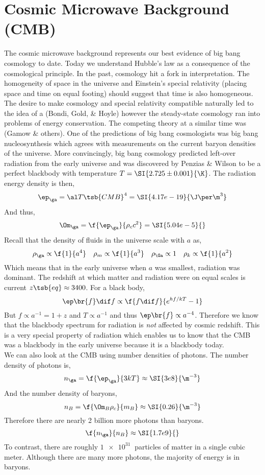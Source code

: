 \documentclass{article}
\begin{document}
\section{Cosmic Microwave Background (CMB)}
The cosmic microwave background represents our best evidence of big bang cosmology to date. Today we understand Hubble's law as a consequence of the cosmological principle. In the past, cosmology hit a fork in interpretation. The homogeneity of space in the universe and Einstein's special relativity (placing space and time on equal footing) should suggest that time is also homogeneous. The desire to make cosmology and special relativity compatible naturally led to the idea of a  (Bondi, Gold, \& Hoyle) however the steady-state cosmology ran into problems of energy conservation. The competing theory at a similar time was  (Gamow \& others). One of the predictions of big bang cosmologists was big bang nucleosynthesis which agrees with measurements on the current baryon densities of the universe. More convincingly, big bang cosmology predicted left-over radiation from the early universe and was discovered by Penzias \& Wilson to be a perfect blackbody with temperature $T = \SI{2.725\pm0.001}{\K}$. The radiation energy density is then,
\[ \ep_{\ga} = \al T\tsb{CMB}^4 = \SI{4.17e-19}{\J\per\m^3} \]
And thus,
\[ \Om_{\ga} = \f{\ep_\ga}{\rho_c c^2} = \SI{5.04e-5}{} \]
Recall that the density of fluids in the universe scale with $a$ as,
\[ \rho_{\ga} \propto \f{1}{a^4} \quad \rho_{m} \propto \f{1}{a^3} \quad\rho_{\Ga} \propto 1 \quad\rho_{k} \propto \f{1}{a^2} \]
Which means that in the early universe when $a$ was smallest, radiation was dominant. The redshift at which matter and radiation were on equal scales is current $z\tsb{eq} \approx 3400$. For a black body,
\[ \ep\br{f} \dif f \propto \f{f \dif f}{e^{hf /k T} - 1} \]
But $f \propto a^{-1} = 1 + z$ and $T \propto a^{-1}$ and thus $\ep\br{f} \propto a^{-4}$. Therefore we know that the blackbody spectrum for radiation is \textit{not} affected by cosmic redshift. This is a very special property of radiation which enables us to know that the CMB was a blackbody in the early universe because it is a blackbody today.\\

We can also look at the CMB using number densities of photons. The number density of photons is,
\[ n_\ga = \f{\ep_\ga}{3 k T} \approx \SI{3e8}{\m^{-3}} \]
And the number density of baryons,
\[ n_B = \f{\Om_B \rho_c}{m_B} \approx \SI{0.26}{\m^{-3}} \]
Therefore there are nearly 2 billion more photons than baryons.
\[ \f{n_\ga}{n_B} \approx \SI{1.7e9}{} \]
To contrast, there are roughly $\SI{1e31}{}$ particles of matter in a single cubic meter. Although there are many more photons, the majority of energy is in baryons. \\
\end{document}
